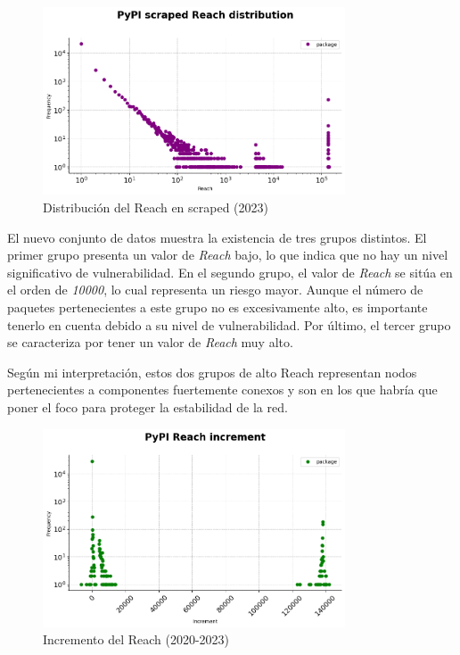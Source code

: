 \begin{figure}[ht!]
    \begin{center}
        \includegraphics[width=0.8\textwidth]{img/pypi/scraped_reach_distribution.png}
        \caption{Distribución del Reach en scraped (2023)}
    \end{center}
    \label{fig:Distribución del Reach en scraped}
\end{figure}

El nuevo conjunto de datos muestra la existencia de tres grupos distintos. El primer grupo presenta
un valor de \textit{Reach} bajo, lo que indica que no hay un nivel significativo de vulnerabilidad. En el
segundo grupo, el valor de \textit{Reach} se sitúa en el orden de \textit{10000}, lo cual representa un riesgo mayor.
Aunque el número de paquetes pertenecientes a este grupo no es excesivamente alto, es importante
tenerlo en cuenta debido a su nivel de vulnerabilidad. Por último, el tercer grupo se caracteriza
por tener un valor de \textit{Reach} muy alto.

Según mi interpretación, estos dos grupos de alto Reach representan nodos pertenecientes a componentes
fuertemente conexos y son en los que habría que poner el foco para proteger la estabilidad de la red.

\begin{figure}[ht!]
    \begin{center}
        \includegraphics[width=0.8\textwidth]{img/pypi/reach_increment.png}
        \caption{Incremento del Reach (2020-2023)}
    \end{center}
    \label{fig:pypi_reach_increment}
\end{figure}

